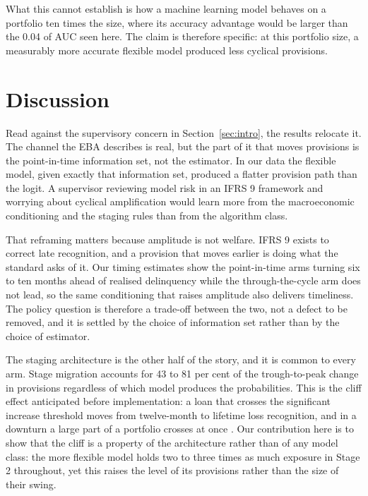 \documentclass[11pt]{article}
\begin{document}
What this cannot establish is how a machine learning model behaves on a portfolio ten times the size, where its
accuracy advantage would be larger than the 0.04 of AUC seen here. The claim is therefore specific: at this
portfolio size, a measurably more accurate flexible model produced less cyclical provisions.

\section{Discussion}
\label{sec:discussion}
Read against the supervisory concern in Section~\ref{sec:intro}, the results relocate it. The channel the EBA
describes is real, but the part of it that moves provisions is the point-in-time information set, not the
estimator. In our data the flexible model, given exactly that information set, produced a flatter provision path
than the logit. A supervisor reviewing model risk in an IFRS 9 framework and worrying about cyclical amplification
would learn more from the macroeconomic conditioning and the staging rules than from the algorithm class.

That reframing matters because amplitude is not welfare. IFRS 9 exists to correct late recognition, and a
provision that moves earlier is doing what the standard asks of it. Our timing estimates show the point-in-time
arms turning six to ten months ahead of realised delinquency while the through-the-cycle arm does not lead, so the
same conditioning that raises amplitude also delivers timeliness. The policy question is therefore a trade-off
between the two, not a defect to be removed, and it is settled by the choice of information set rather than by the
choice of estimator.

The staging architecture is the other half of the story, and it is common to every arm. Stage migration accounts
for 43 to 81 per cent of the trough-to-peak change in provisions regardless of which model produces the
probabilities. This is the cliff effect anticipated before implementation: a loan that crosses the significant
increase threshold moves from twelve-month to lifetime loss recognition, and in a downturn a large part of a
portfolio crosses at once \citep{esrb2017ifrs9, abad2017cyclical}. Our contribution here is to show that the cliff
is a property of the architecture rather than of any model class: the more flexible model holds two to three times
as much exposure in Stage 2 throughout, yet this raises the level of its provisions rather than the size of their
swing.
\end{document}
